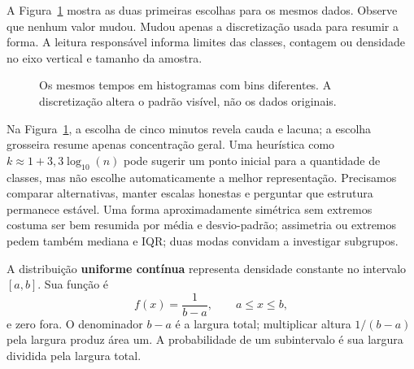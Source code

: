 A Figura~\ref{fig:histograma-bins} mostra as duas primeiras escolhas para os mesmos dados. Observe que nenhum valor mudou. Mudou apenas a discretização usada para resumir a forma. A leitura responsável informa limites das classes, contagem ou densidade no eixo vertical e tamanho da amostra.

\begin{figure}[htbp]
\centering
{}
\caption{Os mesmos tempos em histogramas com bins diferentes. A discretização altera o padrão visível, não os dados originais.}
\label{fig:histograma-bins}
\end{figure}

Na Figura~\ref{fig:histograma-bins}, a escolha de cinco minutos revela cauda e lacuna; a escolha grosseira resume apenas concentração geral. Uma heurística como $k\approx1+3{,}3\log_{10}(n)$ pode sugerir um ponto inicial para a quantidade de classes, mas não escolhe automaticamente a melhor representação. Precisamos comparar alternativas, manter escalas honestas e perguntar que estrutura permanece estável. Uma forma aproximadamente simétrica sem extremos costuma ser bem resumida por média e desvio-padrão; assimetria ou extremos pedem também mediana e IQR; duas modas convidam a investigar subgrupos.

A distribuição \textbf{uniforme contínua} representa densidade constante no intervalo $[a,b]$. Sua função é
\[
f(x)=\frac{1}{b-a},\qquad a\leq x\leq b,
\]
e zero fora. O denominador $b-a$ é a largura total; multiplicar altura $1/(b-a)$ pela largura produz área um. A probabilidade de um subintervalo é sua largura dividida pela largura total.


